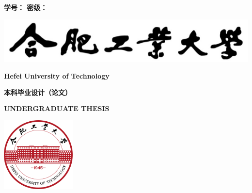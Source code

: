 \begin{titlepage}
    {
        \heiti \bfseries
        学\hspace{1.5em}号：\underlineFixlen[3.5cm]{\studentID} \hfill
        密\hspace{1.5em}级：\underlineFixlen[3.5cm]{\privacy}
    }

    \centering
    {\vspace{1.7cm} \includegraphics{img/hfut_name.png}\vspace{0.3cm}}

    {\LARGE \bfseries Hefei University of Technology}\vspace{0.7cm}

    {\chuhao \heiti \bfseries 本科毕业设计（论文）}\vspace{0.5cm}

    {\LARGE \bfseries UNDERGRADUATE THESIS}\vspace{0.9cm}

    {\includegraphics[width=3.76cm, height=3.76cm]{img/hfut_logo.png}\vspace{0.5cm}}


\end{titlepage}
